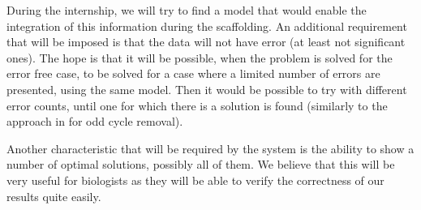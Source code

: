 \documentclass[11pt]{article}
\begin{document}
During the internship, we will try to find a model that would enable the
integration of this information during the scaffolding. An additional
requirement that will be imposed is that the data will not have error (at least
not significant ones). The hope is that it will be possible, when the problem is
solved for the error free case, to be solved for a case where a limited number
of errors are presented, using the same model. Then it would be possible to try
with different error counts, until one for which there is a solution is found
(similarly to the approach in \cite{SCARPA} for odd cycle removal).

Another characteristic that will be required by the system is the ability to
show a number of optimal solutions, possibly all of them. We believe that this
will be very useful for biologists as they will be able to verify the
correctness of our results quite easily.
\end{document}
